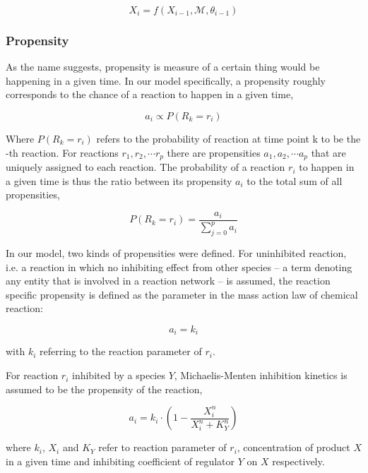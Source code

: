 \documentclass{bioinfo}
\begin{document}
\begin{equation}
X_i = f(X_{i - 1}, \mathcal{M}, \theta_{i - 1})\label{eq:02}
\end{equation}

\subsubsection{Propensity}

As the name suggests, propensity is measure of a certain thing would be happening in a given time. In our model specifically, a propensity roughly corresponds to the chance of a reaction to happen in a given time,

\begin{equation}
a_i \propto P(R_k = r_i)
\end{equation}

Where $P(R_k = r_i)$ refers to the probability of reaction at time point k to be the -th reaction. For reactions $r_1, r_2, \cdots r_p$ there are propensities $a_1, a_2, \cdots a_p$ that are uniquely assigned to each reaction. The probability of a reaction $r_i$ to happen in a given time is thus the ratio between its propensity $a_i$ to the total sum of all propensities,

\begin{equation}
P(R_k = r_i) = \frac{a_i}{\sum_{j=0}^{p} a_i}
\end{equation}

In our model, two kinds of propensities were defined. For uninhibited reaction, i.e. a reaction in which no inhibiting effect from other species -- a term denoting any entity that is involved in a reaction network -- is assumed, the reaction specific propensity is defined as the parameter in the mass action law of chemical reaction:

\begin{equation}
a_i = k_i \label{eq:23}
\end{equation}

with $k_i$ referring to the reaction parameter of $r_i$.

For reaction $r_i$ inhibited by a species $Y$, Michaelis-Menten inhibition kinetics is assumed to be the propensity of the reaction,

\begin{equation}
a_i = k_i \cdot (1 - \frac{X_i^{n}}{X_i^{n} + K_{Y}^{n}})\label{eq:24}
\end{equation}

where $k_i$, $X_i$ and $K_{Y}$ refer to reaction parameter of $r_i$, concentration of product $X$ in a given time and inhibiting coefficient of regulator $Y$ on $X$ respectively.
\end{document}
